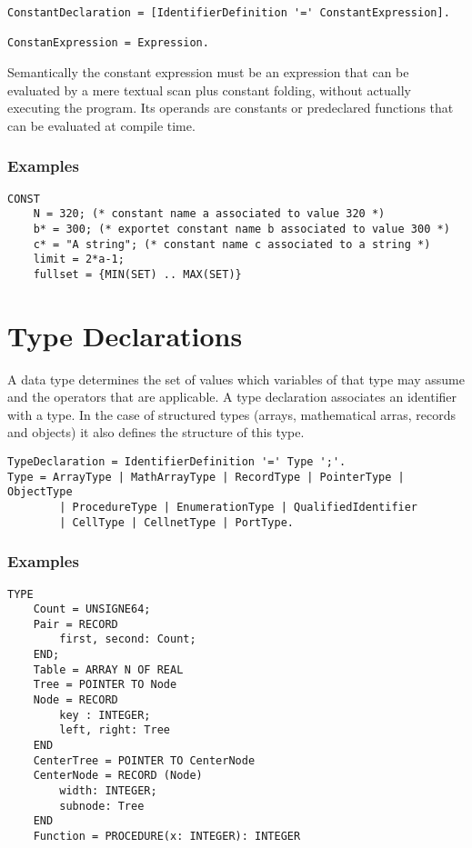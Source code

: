 \documentclass[a4wide,11pt]{article}
\begin{document}
\begin{lstlisting}[style = ebnf]
ConstantDeclaration = [IdentifierDefinition '=' ConstantExpression].

ConstanExpression = Expression.
\end{lstlisting}

Semantically the constant expression must be an expression that can be evaluated by a mere textual scan plus constant folding, without actually executing the program.
Its operands are constants or predeclared functions that can be evaluated at compile time.

\begin{annotation}
\subsubsection{Examples}
\begin{lstlisting}[style=example]
CONST
	N = 320; (* constant name a associated to value 320 *)
	b* = 300; (* exportet constant name b associated to value 300 *)
	c* = "A string"; (* constant name c associated to a string *)
	limit = 2*a-1;
	fullset = {MIN(SET) .. MAX(SET)}
\end{lstlisting}
\end{annotation}


\section{Type Declarations}
A data type determines the set of values which variables of that type may assume and the operators that are applicable.
A type declaration associates an identifier with a type.
In the case of structured types (arrays, mathematical arras, records and objects) it also defines the structure of this type.

\begin{lstlisting}[style = ebnf]
TypeDeclaration = IdentifierDefinition '=' Type ';'.
Type = ArrayType | MathArrayType | RecordType | PointerType | ObjectType
        | ProcedureType | EnumerationType | QualifiedIdentifier
        | CellType | CellnetType | PortType.
\end{lstlisting}

\begin{annotation}
\subsubsection{Examples}
\begin{lstlisting}[style=example, caption=Examples of Type Declarations]
TYPE
	Count = UNSIGNE64;
	Pair = RECORD
		first, second: Count;
	END;
	Table = ARRAY N OF REAL
	Tree = POINTER TO Node
	Node = RECORD
		key : INTEGER;
		left, right: Tree
	END
	CenterTree = POINTER TO CenterNode
	CenterNode = RECORD (Node)
		width: INTEGER;
		subnode: Tree
	END
	Function = PROCEDURE(x: INTEGER): INTEGER
\end{lstlisting}
\end{annotation}
\end{document}
